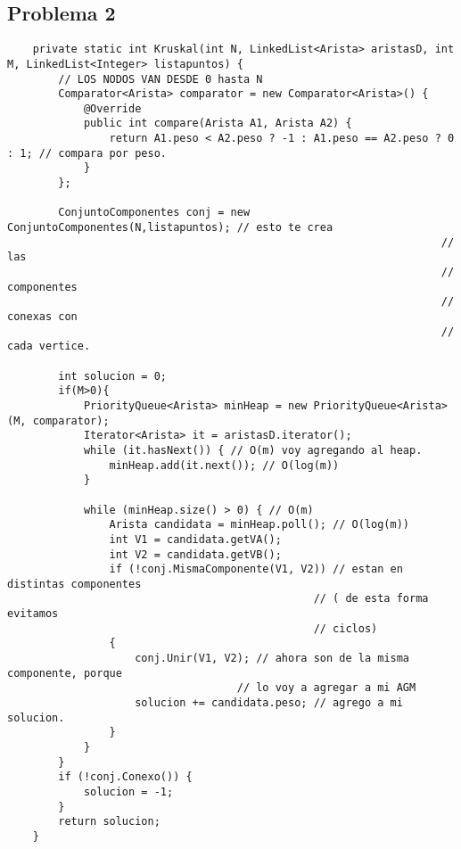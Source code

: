 \newpage

\subsection{Problema 2}
\begin{lstlisting}
	private static int Kruskal(int N, LinkedList<Arista> aristasD, int M, LinkedList<Integer> listapuntos) {
		// LOS NODOS VAN DESDE 0 hasta N
		Comparator<Arista> comparator = new Comparator<Arista>() {
			@Override
			public int compare(Arista A1, Arista A2) {
				return A1.peso < A2.peso ? -1 : A1.peso == A2.peso ? 0 : 1; // compara por peso.
			}
		};

		ConjuntoComponentes conj = new ConjuntoComponentes(N,listapuntos); // esto te crea
																	// las
																	// componentes
																	// conexas con
																	// cada vertice.

		int solucion = 0;
    	if(M>0){
	    	PriorityQueue<Arista> minHeap = new PriorityQueue<Arista>(M, comparator);
			Iterator<Arista> it = aristasD.iterator();
			while (it.hasNext()) { // O(m) voy agregando al heap.
				minHeap.add(it.next()); // O(log(m))
			}

			while (minHeap.size() > 0) { // O(m)
				Arista candidata = minHeap.poll(); // O(log(m))
				int V1 = candidata.getVA();
				int V2 = candidata.getVB();
				if (!conj.MismaComponente(V1, V2)) // estan en distintas componentes
												// ( de esta forma evitamos
												// ciclos)
				{
					conj.Unir(V1, V2); // ahora son de la misma componente, porque
									// lo voy a agregar a mi AGM
					solucion += candidata.peso; // agrego a mi solucion.
				}
			}
    	}
		if (!conj.Conexo()) {
			solucion = -1;
		}
		return solucion;
	}
	\end{lstlisting}
	\newpage

